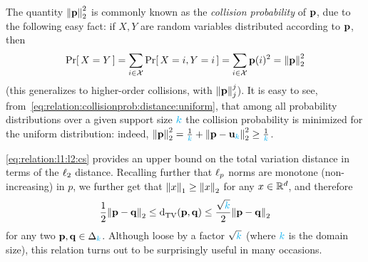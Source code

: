 \begin{remark}
  \label{rk:collision:probability}
  The quantity $\normtwo{\p}^2$ is commonly known as the \emph{collision probability} of $\p$, due to the following easy fact: if $X,Y$ are \iid random variables distributed according to $\p$, then
  \begin{equation}
      \probaOf{X=Y} = \sum_{i\in\domain} \probaOf{X=i, Y=i} = \sum_{i\in\domain} \p(i)^2 = \normtwo{\p}^2
  \end{equation}
  (this generalizes to higher-order collisions, with $\norm{\p}_j^j$). It is easy to see, from~\cref{eq:relation:collisionprob:distance:uniform}, that among all probability distributions over a given support size $\ab$ the collision probability is minimized for the uniform distribution: indeed, $\normtwo{\p}^2 = \frac{1}{\ab}+ \normtwo{\p-\uniform_\ab}^2 \geq \frac{1}{\ab}$. 
\end{remark}

\begin{remark}
  \label{rk:relation:l1:l2}
  \cref{eq:relation:l1:l2:cs} provides an upper bound on the total variation distance in terms of the $\lp[2]$ distance. Recalling further that $\lp[p]$ norms are monotone (non-increasing) in $p$, we further get that $\normone{x}\geq \normtwo{x}$ for any $x\in\R^d$, and therefore
\begin{equation}
  \label{eq:relation:l1:l2:overall}
  \frac{1}{2}\normtwo{\p-\q} \leq \totalvardist{\p}{\q} \leq \frac{\sqrt{\ab}}{2}\normtwo{\p-\q}
\end{equation}
for any two $\p,\q\in\distribs{\ab}$. Although loose by a factor $\sqrt{\ab}$ (where $\ab$ is the domain size), this relation turns out to be surprisingly useful in many occasions.
\end{remark}


